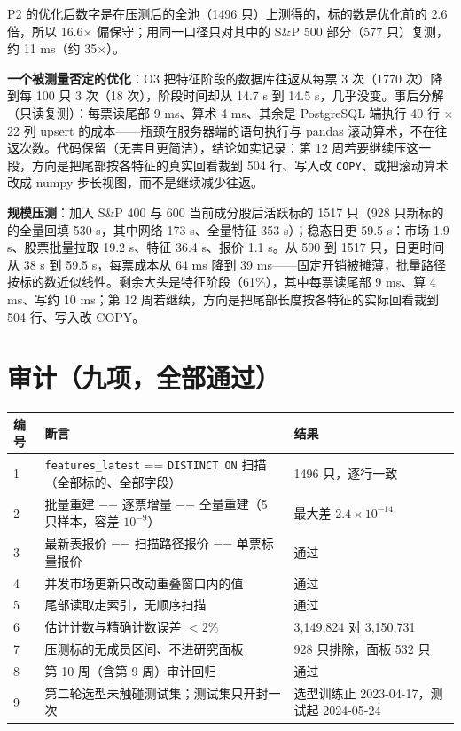 \documentclass[11pt]{ctexart}
\begin{document}
P2 的优化后数字是在压测后的全池（1496 只）上测得的，标的数是优化前的 2.6 倍，所以 16.6$\times$ 偏保守；用同一口径只对其中的 S\&P 500 部分（577 只）复测，约 11 ms（约 35$\times$）。

\textbf{一个被测量否定的优化}：O3 把特征阶段的数据库往返从每票 3 次（1770 次）降到每 100 只 3 次（18 次），阶段时间却从 14.7 s 到 14.5 s，几乎没变。事后分解（只读复测）：每票读尾部 9 ms、算术 4 ms、其余是 PostgreSQL 端执行 40 行 $\times$ 22 列 upsert 的成本——瓶颈在服务器端的语句执行与 pandas 滚动算术，不在往返次数。代码保留（无害且更简洁），结论如实记录：第 12 周若要继续压这一段，方向是把尾部按各特征的真实回看裁到 504 行、写入改 \texttt{COPY}、或把滚动算术改成 numpy 步长视图，而不是继续减少往返。

\textbf{规模压测}：加入 S\&P 400 与 600 当前成分股后活跃标的 1517 只（928 只新标的的全量回填 530 s，其中网络 173 s、全量特征 353 s）；稳态日更 59.5 s：市场 1.9 s、股票批量拉取 19.2 s、特征 36.4 s、报价 1.1 s。从 590 到 1517 只，日更时间从 38 s 到 59.5 s，每票成本从 64 ms 降到 39 ms——固定开销被摊薄，批量路径按标的数近似线性。剩余大头是特征阶段（61\%），其中每票读尾部 9 ms、算 4 ms、写约 10 ms；第 12 周若继续，方向是把尾部长度按各特征的实际回看裁到 504 行、写入改 COPY。

\section{审计（九项，全部通过）}

\begin{center}\small
\begin{tabular}{p{0.8cm}p{8.4cm}p{5.8cm}}
\toprule
编号 & 断言 & 结果 \\
\midrule
1 & \texttt{features\_latest} == \texttt{DISTINCT ON} 扫描（全部标的、全部字段） & 1496 只，逐行一致 \\
2 & 批量重建 == 逐票增量 == 全量重建（5 只样本，容差 $10^{-9}$） & 最大差 $2.4\times10^{-14}$ \\
3 & 最新表报价 == 扫描路径报价 == 单票标量报价 & 通过 \\
4 & 并发市场更新只改动重叠窗口内的值 & 通过 \\
5 & 尾部读取走索引，无顺序扫描 & 通过 \\
6 & 估计计数与精确计数误差 $<2\%$ & 3{,}149{,}824 对 3{,}150{,}731 \\
7 & 压测标的无成员区间、不进研究面板 & 928 只排除，面板 532 只 \\
8 & 第 10 周（含第 9 周）审计回归 & 通过 \\
9 & 第二轮选型未触碰测试集；测试集只开封一次 & 选型训练止 2023-04-17，测试起 2024-05-24 \\
\bottomrule
\end{tabular}
\end{center}
\end{document}
